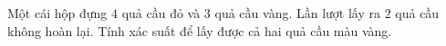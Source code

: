 \begin{ex}
Một cái hộp đựng $4$ quả cầu đỏ và $3$ quả cầu vàng. Lần lượt lấy ra $2$ quả cầu không hoàn lại. Tính xác suất để lấy được cả hai quả cầu màu vàng.
\end{ex}
